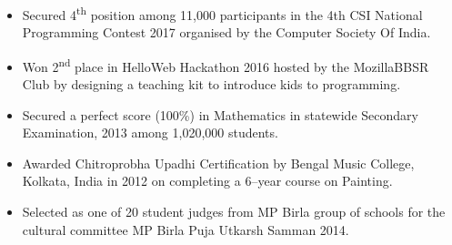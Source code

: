 \documentclass[a4paper,10pt]{article}
\begin{document}
\begin{itemize}
\item {Secured 4\textsuperscript{th} position among 11,000 participants in the 4th CSI National Programming Contest 2017 organised by the Computer Society Of India.}\\[-0.5cm]
\item {Won 2\textsuperscript{nd} place in HelloWeb Hackathon 2016 hosted by the MozillaBBSR Club by designing a teaching kit to introduce kids to programming.}\\[-0.5cm]
\item {Secured a perfect score (100\%) in Mathematics in statewide Secondary Examination, 2013 among 1,020,000 students.}\\[-0.5cm]
\item {Awarded Chitroprobha Upadhi Certification by Bengal Music College, Kolkata, India in 2012 on completing a 6--year course on Painting.}\\[-0.5cm]
\item{Selected as one of 20 student judges from MP Birla group of schools for the cultural committee MP Birla Puja Utkarsh Samman 2014.}
\end{itemize}
\end{document}
